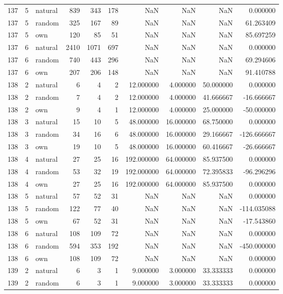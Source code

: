 \begin{table}[htbp]
\begin{tabular}{rrlrrrrrrr}
137 & 5 & natural & 839 & 343 & 178 & NaN & NaN & NaN & 0.000000 \\
137 & 5 & random & 325 & 167 & 89 & NaN & NaN & NaN & 61.263409 \\
137 & 5 & own & 120 & 85 & 51 & NaN & NaN & NaN & 85.697259 \\
137 & 6 & natural & 2410 & 1071 & 697 & NaN & NaN & NaN & 0.000000 \\
137 & 6 & random & 740 & 443 & 296 & NaN & NaN & NaN & 69.294606 \\
137 & 6 & own & 207 & 206 & 148 & NaN & NaN & NaN & 91.410788 \\
138 & 2 & natural & 6 & 4 & 2 & 12.000000 & 4.000000 & 50.000000 & 0.000000 \\
138 & 2 & random & 7 & 4 & 2 & 12.000000 & 4.000000 & 41.666667 & -16.666667 \\
138 & 2 & own & 9 & 4 & 1 & 12.000000 & 4.000000 & 25.000000 & -50.000000 \\
138 & 3 & natural & 15 & 10 & 5 & 48.000000 & 16.000000 & 68.750000 & 0.000000 \\
138 & 3 & random & 34 & 16 & 6 & 48.000000 & 16.000000 & 29.166667 & -126.666667 \\
138 & 3 & own & 19 & 10 & 5 & 48.000000 & 16.000000 & 60.416667 & -26.666667 \\
138 & 4 & natural & 27 & 25 & 16 & 192.000000 & 64.000000 & 85.937500 & 0.000000 \\
138 & 4 & random & 53 & 32 & 19 & 192.000000 & 64.000000 & 72.395833 & -96.296296 \\
138 & 4 & own & 27 & 25 & 16 & 192.000000 & 64.000000 & 85.937500 & 0.000000 \\
138 & 5 & natural & 57 & 52 & 31 & NaN & NaN & NaN & 0.000000 \\
138 & 5 & random & 122 & 77 & 40 & NaN & NaN & NaN & -114.035088 \\
138 & 5 & own & 67 & 52 & 31 & NaN & NaN & NaN & -17.543860 \\
138 & 6 & natural & 108 & 109 & 72 & NaN & NaN & NaN & 0.000000 \\
138 & 6 & random & 594 & 353 & 192 & NaN & NaN & NaN & -450.000000 \\
138 & 6 & own & 108 & 109 & 72 & NaN & NaN & NaN & 0.000000 \\
139 & 2 & natural & 6 & 3 & 1 & 9.000000 & 3.000000 & 33.333333 & 0.000000 \\
139 & 2 & random & 6 & 3 & 1 & 9.000000 & 3.000000 & 33.333333 & 0.000000 \\

\end{tabular}
\end{table}
